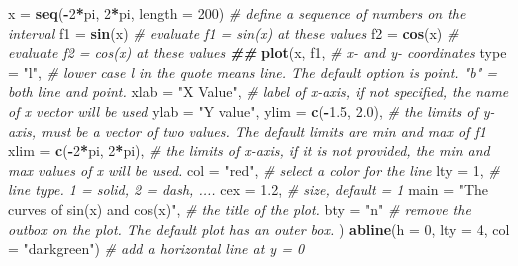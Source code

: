 \documentclass[
]{book}
\newenvironment{Shaded}{\begin{snugshade}}{\end{snugshade}}
\newcommand{\AttributeTok}[1]{\textcolor[rgb]{0.13,0.29,0.53}{#1}}
\newcommand{\CommentTok}[1]{\textcolor[rgb]{0.56,0.35,0.01}{\textit{#1}}}
\newcommand{\DecValTok}[1]{\textcolor[rgb]{0.00,0.00,0.81}{#1}}
\newcommand{\DocumentationTok}[1]{\textcolor[rgb]{0.56,0.35,0.01}{\textbf{\textit{#1}}}}
\newcommand{\FloatTok}[1]{\textcolor[rgb]{0.00,0.00,0.81}{#1}}
\newcommand{\FunctionTok}[1]{\textcolor[rgb]{0.13,0.29,0.53}{\textbf{#1}}}
\newcommand{\NormalTok}[1]{#1}
\newcommand{\OtherTok}[1]{\textcolor[rgb]{0.56,0.35,0.01}{#1}}
\newcommand{\SpecialCharTok}[1]{\textcolor[rgb]{0.81,0.36,0.00}{\textbf{#1}}}
\newcommand{\StringTok}[1]{\textcolor[rgb]{0.31,0.60,0.02}{#1}}
\begin{document}
\begin{Shaded}
\begin{Highlighting}[]
\NormalTok{x }\OtherTok{=} \FunctionTok{seq}\NormalTok{(}\SpecialCharTok{{-}}\DecValTok{2}\SpecialCharTok{*}\NormalTok{pi, }\DecValTok{2}\SpecialCharTok{*}\NormalTok{pi, }\AttributeTok{length =} \DecValTok{200}\NormalTok{)  }\CommentTok{\# define a sequence of numbers on the interval}
\NormalTok{f1 }\OtherTok{=} \FunctionTok{sin}\NormalTok{(x)                         }\CommentTok{\# evaluate f1 = sin(x) at these values}
\NormalTok{f2 }\OtherTok{=} \FunctionTok{cos}\NormalTok{(x)                         }\CommentTok{\# evaluate f2 = cos(x) at these values}
\DocumentationTok{\#\#}
\FunctionTok{plot}\NormalTok{(x, f1,                         }\CommentTok{\# x{-} and y{-} coordinates}
        \AttributeTok{type =} \StringTok{"l"}\NormalTok{,                 }\CommentTok{\# lower case l in the quote means line. The default option is point. "b" = both line and point.}
        \AttributeTok{xlab =} \StringTok{"X Value"}\NormalTok{,           }\CommentTok{\# label of x{-}axis, if not specified, the name of x vector will be used}
        \AttributeTok{ylab =} \StringTok{"Y value"}\NormalTok{, }
        \AttributeTok{ylim =} \FunctionTok{c}\NormalTok{(}\SpecialCharTok{{-}}\FloatTok{1.5}\NormalTok{, }\FloatTok{2.0}\NormalTok{),        }\CommentTok{\# the limits of y{-}axis, must be a vector of two values. The default limits are min and max of f1}
        \AttributeTok{xlim =} \FunctionTok{c}\NormalTok{(}\SpecialCharTok{{-}}\DecValTok{2}\SpecialCharTok{*}\NormalTok{pi, }\DecValTok{2}\SpecialCharTok{*}\NormalTok{pi),      }\CommentTok{\# the limits of x{-}axis, if it is not provided, the min and max values of x will be used.}
        \AttributeTok{col =} \StringTok{"red"}\NormalTok{,                }\CommentTok{\# select a color for the line}
        \AttributeTok{lty =} \DecValTok{1}\NormalTok{,                    }\CommentTok{\# line type. 1 = solid, 2 = dash, ....}
        \AttributeTok{cex =} \FloatTok{1.2}\NormalTok{,                  }\CommentTok{\# size, default = 1}
        \AttributeTok{main =} \StringTok{"The curves of sin(x) and cos(x)"}\NormalTok{,   }\CommentTok{\# the title of the plot.}
        \AttributeTok{bty =} \StringTok{"n"}                   \CommentTok{\# remove the outbox on the plot. The default plot has an outer box.}
\NormalTok{     )}
\FunctionTok{abline}\NormalTok{(}\AttributeTok{h =} \DecValTok{0}\NormalTok{, }\AttributeTok{lty =} \DecValTok{4}\NormalTok{, }\AttributeTok{col =} \StringTok{"darkgreen"}\NormalTok{)                       }\CommentTok{\# add a horizontal line at y = 0}

\end{Highlighting}
\end{Shaded}
\end{document}
